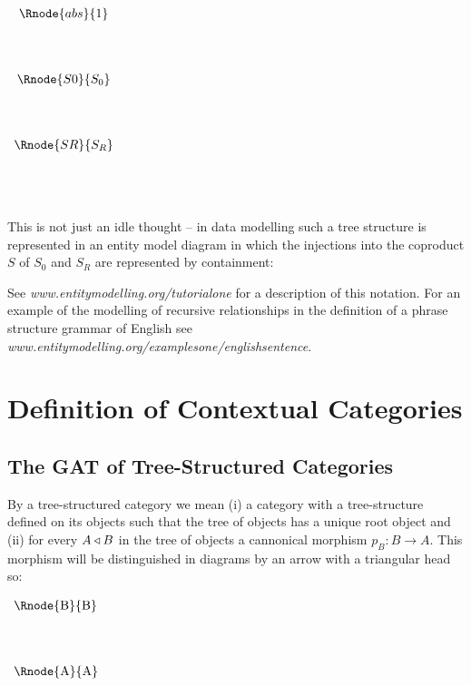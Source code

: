 \documentclass[10pt,a4paper]{scrartcl}
\begin{document}
\begin{center}
$
\begin{array}{c c}
\Rnode{abs}{1}  \\ [1.4cm]
\Rnode{S0}{S_0} \\ [1.4cm]
\Rnode{SR}{S_R} \\ [1.4cm]
\end{array}
$
\end{center}

\noindent This is not just an idle thought -- in  data modelling such a tree 
structure is represented in an entity model diagram in which the injections into the coproduct $S$ of $S_0$ and $S_R$ are represented by containment: \\

\begin{center}

\end {center}
See \textit{www.entitymodelling.org/tutorialone} for a description of this notation.
For an example of the modelling of recursive relationships in the definition of a phrase structure grammar of English see 
\textit{www.entitymodelling.org/examplesone/englishsentence}.

\section{Definition of Contextual Categories}
\subsection {The GAT of Tree-Structured Categories}

By a tree-structured category we mean (i) a category with a tree-structure defined on its objects such that the tree of objects has a unique root object and (ii) for every $A \triangleleft B$ in the tree of objects  a cannonical morphism $p_B:B \rightarrow A$. This morphism will be distinguished in diagrams by an arrow with  
a triangular head so:

\begin{center}
$
\begin{array}{p{2cm}p{0.5cm}p{0.5cm}p{0.5cm}}
\Rnode{B}{B}& \\ [1.4cm]
\Rnode{A}{A} \\
\end{array}
$

\end{center}

\newcommand{\Obi}[1]{\Ob_{#1}}
\newcommand{\Homij}[2]{\Hom_{#1,#2}}
\newcommand{\ofObi}[2]{#1 \bbin{#2}{\Ob}}
\newcommand{\HomijBar}[4]{\Homij{#1}{#2}(#3,#4)}
\newcommand{\ofHomij}[5]{\ofT{#1}{\HomijBar{#2}{#3}{#4}{#5}}}
\newcommand{\HomijBarFt}[4]{\Homij{#1}{#2}(#3,\ft{#4})}
\newcommand{\ofHomiBarFt}[4]{\ofT{#1}{\HomijBarFt{#2}{#2-1}{#3}{#4}}}
\end{document}
